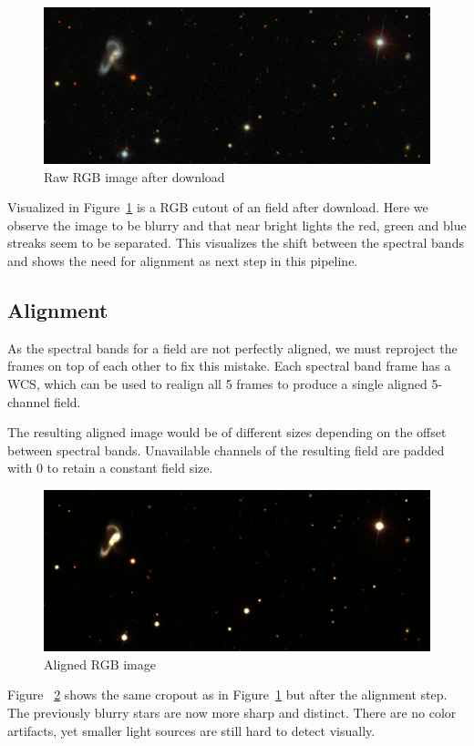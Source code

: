 \documentclass[
a4paper,     %
10pt         %
]{scrartcl}  %
\begin{document}
\begin{figure}[h]
    \center
    \includegraphics[width=\textwidth]{figures/crop_original}
    \caption{Raw RGB image after download}\label{fig:download_rgb}
\end{figure}
Visualized in Figure~\ref{fig:download_rgb} is a RGB cutout of an field after download.
Here we observe the image to be blurry and that near bright lights the red, green and blue streaks seem to be separated.
This visualizes the shift between the spectral bands and shows the need for alignment as next step in this pipeline.

\subsection{Alignment}
As the spectral bands for a field are not perfectly aligned, we must reproject the frames on top of each other to fix this mistake.
Each spectral band frame has a WCS, which can be used to realign all 5 frames to produce a single aligned 5-channel field.

The resulting aligned image would be of different sizes depending on the offset between spectral bands.
Unavailable channels of the resulting field are padded with $0$ to retain a constant field size.

\begin{figure}[h]
    \center
    \includegraphics[width=\textwidth]{figures/crop_aligned}
    \caption{Aligned RGB image}\label{fig:aligned_rgb}
\end{figure}
Figure ~\ref{fig:aligned_rgb} shows the same cropout as in Figure~\ref{fig:download_rgb} but after the alignment step.
The previously blurry stars are now more sharp and distinct.
There are no color artifacts, yet smaller light sources are still hard to detect visually.
\end{document}
